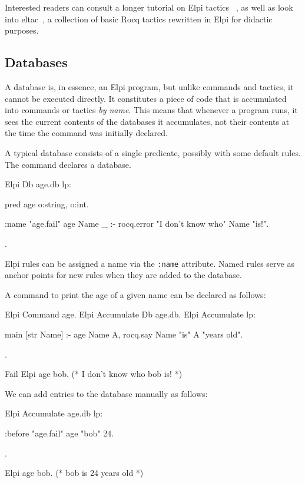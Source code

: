 \documentclass{these-ISSS}
\newenvironment{rocqcode}
  {\VerbatimEnvironment\begin{rocqbox}\begin{xrocqcode}}{\end{xrocqcode}
\end{rocqbox}}
\begin{document}
Interested readers can consult a longer tutorial on Elpi tactics
~\cite{tuto:tactics}, as well as look into eltac~\cite{app:eltac},
a collection of basic Rocq tactics rewritten in Elpi for didactic purposes.

\subsection{Databases}\label{sec:homo}


A database is, in essence, an Elpi program, but unlike commands and tactics,
it cannot be executed directly. It constitutes a piece of code that is
accumulated into commands or tactics \emph{by name}. This means that whenever
a program runs, it sees the current contents of the databases it accumulates,
not their contents at the time the command was initially declared.


A typical database consists of a single predicate, possibly with some default
rules. The  command declares a database.

\begin{rocqcode}
Elpi Db age.db lp:{{
  pred age o:string, o:int.

  :name "age.fail"
  age Name _ :- rocq.error "I don't know who" Name "is!".
}}.
\end{rocqcode}


Elpi rules can be assigned a name via the \texttt{:name} attribute. Named rules
serve as anchor points for new rules when they are added to the database.


A command to print the age of a given name can be declared as follows:

\begin{rocqcode}
Elpi Command age.
Elpi Accumulate Db age.db.
Elpi Accumulate lp:{{

  main [str Name] :-
    age Name A,
    rocq.say Name "is" A "years old".

}}.

Fail Elpi age bob. (* I don't know who bob is! *)
\end{rocqcode}


We can add entries to the database manually as follows:

\begin{rocqcode}
Elpi Accumulate age.db lp:{{

  :before "age.fail"     %
  age "bob" 24.

}}.

Elpi age bob. (* bob is 24 years old *)
\end{rocqcode}
\end{document}
